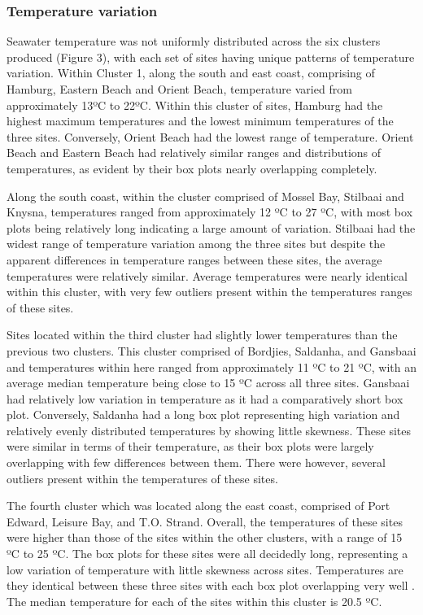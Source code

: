 \documentclass[12pt,a4paper,]{article}
\begin{document}
\hypertarget{temperature-variation}{%
\subsubsection{Temperature variation}\label{temperature-variation}}

Seawater temperature was not uniformly distributed across the six
clusters produced (Figure 3), with each set of sites having unique
patterns of temperature variation. Within Cluster 1, along the south and
east coast, comprising of Hamburg, Eastern Beach and Orient Beach,
temperature varied from approximately 13ºC to 22ºC. Within this cluster
of sites, Hamburg had the highest maximum temperatures and the lowest
minimum temperatures of the three sites. Conversely, Orient Beach had
the lowest range of temperature. Orient Beach and Eastern Beach had
relatively similar ranges and distributions of temperatures, as evident
by their box plots nearly overlapping completely.

Along the south coast, within the cluster comprised of Mossel Bay,
Stilbaai and Knysna, temperatures ranged from approximately 12 ºC to 27
ºC, with most box plots being relatively long indicating a large amount
of variation. Stilbaai had the widest range of temperature variation
among the three sites but despite the apparent differences in
temperature ranges between these sites, the average temperatures were
relatively similar. Average temperatures were nearly identical within
this cluster, with very few outliers present within the temperatures
ranges of these sites.

Sites located within the third cluster had slightly lower temperatures
than the previous two clusters. This cluster comprised of Bordjies,
Saldanha, and Gansbaai and temperatures within here ranged from
approximately 11 ºC to 21 ºC, with an average median temperature being
close to 15 ºC across all three sites. Gansbaai had relatively low
variation in temperature as it had a comparatively short box plot.
Conversely, Saldanha had a long box plot representing high variation and
relatively evenly distributed temperatures by showing little skewness.
These sites were similar in terms of their temperature, as their box
plots were largely overlapping with few differences between them. There
were however, several outliers present within the temperatures of these
sites.

The fourth cluster which was located along the east coast, comprised of
Port Edward, Leisure Bay, and T.O. Strand. Overall, the temperatures of
these sites were higher than those of the sites within the other
clusters, with a range of 15 ºC to 25 ºC. The box plots for these sites
were all decidedly long, representing a low variation of temperature
with little skewness across sites. Temperatures are they identical
between these three sites with each box plot overlapping very well . The
median temperature for each of the sites within this cluster is 20.5 ºC.
\end{document}
